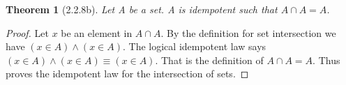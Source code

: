 \documentclass[a4paper, 12pt]{article}
\theoremstyle{plain}
\newtheorem*{theorem*}{Theorem}
\begin{document}
	
	\begin{theorem*}[2.2.8b]
		Let A be a set. A is idempotent such that $A \cap A = A$.
	\end{theorem*}
	
	\begin{proof}
		Let $x$ be an element in $A \cap A$. By the definition for set intersection we have 
		$(x \in A) \land (x \in A)$. The logical idempotent law says \newline 
		$(x \in A) \land (x \in A) \equiv (x \in A)$. That is the definition of $A \cap A = A$. 
		Thus proves the idempotent law for the intersection of sets.
	\end{proof}
\end{document}
